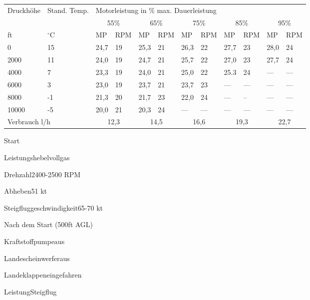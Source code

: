 \begin{table*}[t]
  \centering
  \begin{tabular}{@{}ll|ll|ll|ll|ll|ll@{}}
    \multirow{2}{*}{Druckhöhe} &
      \multirow{2}{*}{Stand. Temp.} &
      \multicolumn{10}{l}{Motorleistung in \% max. Dauerleistung} \\ \cmidrule(l){3-12} 
     &
       &
      \multicolumn{2}{c}{55\%} &
      \multicolumn{2}{c}{65\%} &
      \multicolumn{2}{c}{75\%} &
      \multicolumn{2}{c}{85\%} &
      \multicolumn{2}{c}{95\%} \\ \cmidrule(r){1-2}
    ft    & $^{\circ}$C & MP   & RPM & MP   & RPM & MP   & RPM & MP   & RPM & MP   & RPM \\
    0     & 15 & 24,7 & 19  & 25,3 & 21  & 26,3 & 22  & 27,7 & 23  & 28,0 & 24  \\\hline
    2000  & 11 & 24,0 & 19  & 24,7 & 21  & 25,7 & 22  & 27,0 & 23  & 27,7 & 24  \\\hline
    4000  & 7  & 23,3 & 19  & 24,0 & 21  & 25,0 & 22  & 25.3 & 24  & ---  & --- \\\hline
    6000  & 3  & 23,0 & 19  & 23,7 & 21  & 23,7 & 23  & ---  & --- & ---  & --- \\\hline
    8000  & -1 & 21,3 & 20  & 21,7 & 23  & 22,0 & 24  & ---  & --  & ---  & --- \\\hline
    10000 & -5 & 20,0 & 21  & 20,3 & 24  & ---  & --- & ---  & --- & ---  & --- \\\hline
    \multicolumn{2}{l}{Verbrauch l/h} &
      \multicolumn{2}{c}{12,3} &
      \multicolumn{2}{c}{14,5} &
      \multicolumn{2}{c}{16,6} &
      \multicolumn{2}{c}{19,3} &
      \multicolumn{2}{c}{22,7}
    \end{tabular}
\end{table*}

\begin{memoryitem}
  \begin{checklist}{Start}
    \item{Leistungshebel}{vollgas}
    \item{Drehzahl}{2400-2500 RPM}
    \item{Abheben}{51 kt}
    \item{Steigfluggeschwindigkeit}{65-70 kt}
  \end{checklist}
\end{memoryitem}

\begin{memoryitem}
  \begin{checklist}{Nach dem Start (500ft AGL)}
    \item{Kraftstoffpumpe}{aus}
    \item{Landescheinwerfer}{aus}
    \item{Landeklappen}{eingefahren}
    \item{Leistung}{Steigflug}
  \end{checklist}
\end{memoryitem}

